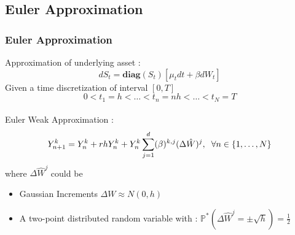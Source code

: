\documentclass[]{beamer}
\begin{document}
\subsection{Euler Approximation}
\begin{frame}
\frametitle{Euler Approximation}
Approximation of underlying asset  : 
\[
dS_t = \textbf{diag}(S_t) [\mu_t dt  +  \beta dW_t]
\]
Given a time discretization of interval $[0,T]$ 
\[0<t_1=h<\dots<t_n=nh<\dots<t_N=T\] \\
Euler Weak Approximation :
\[
Y^k_{n+1}=Y^k_n+ r hY^k_n  + Y^k_n\sum_{j=1}^d (\beta)^{k,j} (\Delta \hat{W})^j, \hspace{0.2cm} \forall n \in \{1,\dots,N\}
\]
where $\Delta \hat{W}^j$ could be 
\begin{itemize}
 \item Gaussian Increments $\Delta W \approx N(0,h)$
 \item A two-point distributed random variable with : $\mathbb{P}^*(\Delta\hat{W}^j=\pm \sqrt{h})=\frac{1}{2}$
\end{itemize}
\end{frame}
\end{document}
